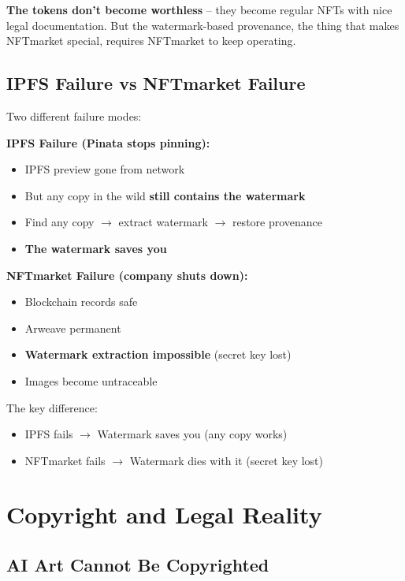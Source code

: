 \documentclass[11pt,a4paper]{article}
\begin{document}
\textbf{The tokens don't become worthless} -- they become regular NFTs with nice legal documentation. But the watermark-based provenance, the thing that makes NFTmarket special, requires NFTmarket to keep operating.

\subsection{IPFS Failure vs NFTmarket Failure}

Two different failure modes:

\textbf{IPFS Failure (Pinata stops pinning):}
\begin{itemize}
    \item IPFS preview gone from network
    \item But any copy in the wild \textbf{still contains the watermark}
    \item Find any copy $\rightarrow$ extract watermark $\rightarrow$ restore provenance
    \item \textbf{The watermark saves you}
\end{itemize}

\textbf{NFTmarket Failure (company shuts down):}
\begin{itemize}
    \item Blockchain records safe
    \item Arweave permanent
    \item \textbf{Watermark extraction impossible} (secret key lost)
    \item Images become untraceable
\end{itemize}

The key difference:
\begin{itemize}
    \item IPFS fails $\rightarrow$ Watermark saves you (any copy works)
    \item NFTmarket fails $\rightarrow$ Watermark dies with it (secret key lost)
\end{itemize}

\newpage
\section{Copyright and Legal Reality}

\subsection{AI Art Cannot Be Copyrighted}
\end{document}
